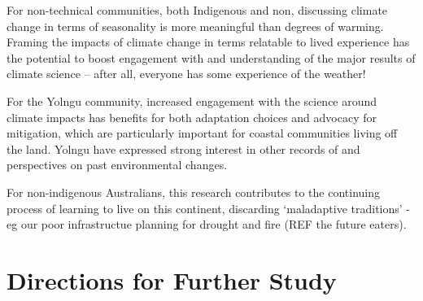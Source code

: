 For non-technical communities, both Indigenous and non, discussing climate
change in terms of seasonality is more meaningful than degrees of warming.
Framing the impacts of climate change in terms relatable to lived experience
has the potential to boost engagement with and understanding of the major
results of climate science – after all, everyone has some experience of the
weather!

For the Yolngu community, increased engagement with the science around climate
impacts has benefits for both adaptation choices and advocacy for mitigation,
which are particularly important for coastal communities living off the land.
Yolngu have expressed strong interest in other records of and perspectives on
past environmental changes.

For non-indigenous Australians, this research contributes to the continuing
process of learning to live on this continent, discarding `maladaptive traditions'
- eg our poor infrastructue planning for drought and fire (REF the future eaters).



\section{Directions for Further Study}
\label{sec:further-study}

